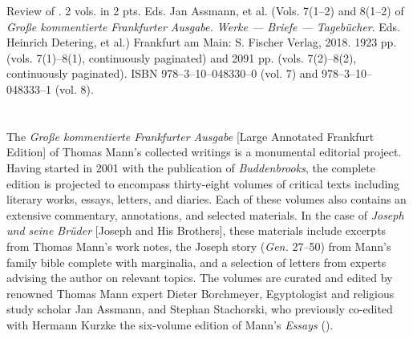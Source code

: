 

\begin{review}
\renewcommand*{\pagemark}{}


\begin{reviewed}
Review of \thecontribution. 2 vols. in 2 pts. Eds. Jan Assmann, et al. (Vols. 7(1--2) and 8(1--2) of \emph{Große kommentierte Frankfurter Ausgabe. Werke --- Briefe ---
Tagebücher}. Eds. Heinrich Detering, et al.) Frankfurt am Main: S.
Fischer Verlag, 2018. 1923 pp. (vols. 7(1)--8(1), continuously paginated) and 2091 pp. (vols. 7(2)--8(2), continuously paginated). ISBN 978--3--10--048330--0 (vol. 7) and 978--3--10--048333--1 (vol. 8).
\end{reviewed}



\section*{} 
The \emph{Große kommentierte Frankfurter Ausgabe} {[}Large
Annotated Frankfurt Edition{]} of Thomas Mann's collected writings is a
monumental editorial project. Having started in 2001 with the
publication of \emph{Buddenbrooks}, the complete edition is projected to
encompass thirty-eight volumes of critical texts including literary
works, essays, letters, and diaries. Each of these volumes also contains
an extensive commentary, annotations, and selected materials. In the
case of \emph{Joseph und seine Brüder} {[}Joseph and His
Brothers{]}, these materials include excerpts from Thomas Mann's work
notes, the Joseph story (\emph{Gen.} 27--50) from Mann's family bible
complete with marginalia, and a selection of letters from experts
advising the author on relevant topics. The volumes are curated and
edited by renowned Thomas Mann expert Dieter Borchmeyer, Egyptologist
and religious study scholar Jan Assmann, and Stephan Stachorski, who
previously co-edited with Hermann Kurzke the six-volume edition of
Mann's \emph{Essays} (\citeyear{mann_essays_1993}).


\end{review}
